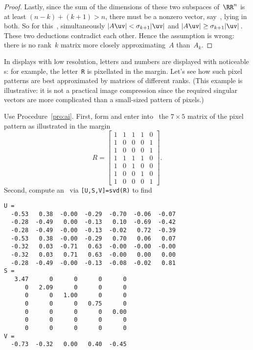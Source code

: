\begin{proof}
Lastly, since the sum of the dimensions of these two subspaces of~\(\RR^n\) is at least \((n-k)+(k+1)>n\), there must be a nonzero vector, say~\uv, lying in both.
So for this~\uv, simultaneously \(|A\uv|<\sigma_{k+1}|\uv|\) and \(|A\uv|\geq\sigma_{k+1}|\uv|\)\,.
These two deductions contradict each other.
Hence the assumption is wrong: there is no rank~\(k\) matrix more closely approximating~\(A\) than~\(A_k\).
\end{proof}



\begin{example} \label{eg:}
In displays with low resolution, letters and numbers are displayed with noticeable s: for example, the letter~\verb|R| is pixellated in the margin.
\marginpar{}%
Let's see how such pixel patterns are best approximated by matrices of different ranks.
(This example is illustrative: it is not a practical image compression since the required singular vectors are more complicated than a small-sized pattern of pixels.)
\begin{solution} 
Use Procedure~\ref{pro:ai}.
First, form and enter into \script\ the \(7\times5\) matrix of the pixel pattern as illustrated in the margin
\begin{equation*}
R=\begin{bmatrix} 1&1&1&1&0
\\1&0&0&0&1
\\1&0&0&0&1
\\1&1&1&1&0
\\1&0&1&0&0
\\1&0&0&1&0
\\1&0&0&0&1 \end{bmatrix}.
\end{equation*}
Second, compute an \svd\ via \verb|[U,S,V]=svd(R)| to find \twodp
\begin{verbatim}
U =
  -0.53   0.38  -0.00  -0.29  -0.70  -0.06  -0.07
  -0.28  -0.49   0.00  -0.13   0.10  -0.69  -0.42
  -0.28  -0.49  -0.00  -0.13  -0.02   0.72  -0.39
  -0.53   0.38  -0.00  -0.29   0.70   0.06   0.07
  -0.32   0.03  -0.71   0.63  -0.00  -0.00  -0.00
  -0.32   0.03   0.71   0.63  -0.00   0.00   0.00
  -0.28  -0.49  -0.00  -0.13  -0.08  -0.02   0.81
S =
   3.47      0      0      0      0
      0   2.09      0      0      0
      0      0   1.00      0      0
      0      0      0   0.75      0
      0      0      0      0   0.00
      0      0      0      0      0
      0      0      0      0      0
V =
  -0.73  -0.32   0.00   0.40  -0.45

\end{verbatim}
\end{solution}
\end{example}
